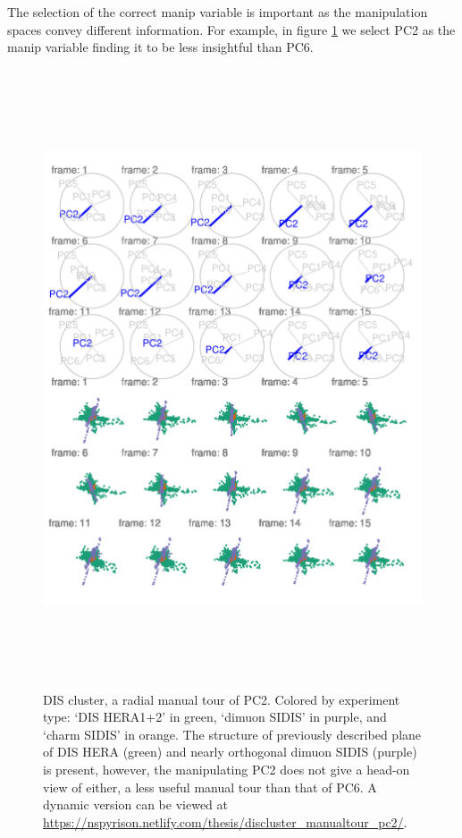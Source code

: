 \documentclass{monashthesis}
\theoremstyle{definition}
\theoremstyle{definition}
\theoremstyle{definition}
\theoremstyle{remark}
\begin{document}
The selection of the correct manip variable is important as the
manipulation spaces convey different information. For example, in figure
\ref{fig:DISclusterBad} we select PC2 as the manip variable finding it
to be less insightful than PC6.










\begin{figure}

{\centering \includegraphics[width=6in,height=7.2in]{./figures/DISclusterBad} 

}

\caption{DIS cluster, a radial manual tour of PC2.
Colored by experiment type: `DIS HERA1+2' in green, `dimuon SIDIS' in
purple, and `charm SIDIS' in orange. The structure of previously
described plane of DIS HERA (green) and nearly orthogonal dimuon SIDIS
(purple) is present, however, the manipulating PC2 does not give a
head-on view of either, a less useful manual tour than that of PC6. A
dynamic version can be viewed at
\url{https://nspyrison.netlify.com/thesis/discluster_manualtour_pc2/}.}\label{fig:DISclusterBad}
\end{figure}
\end{document}
